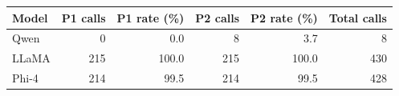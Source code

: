 \begin{tabular}{@{}lrrrrr@{}}
\toprule
Model & P1 calls & P1 rate (\%) & P2 calls & P2 rate (\%) & Total calls \\
\midrule
Qwen & 0 & 0.0 & 8 & 3.7 & 8 \\
LLaMA & 215 & 100.0 & 215 & 100.0 & 430 \\
Phi-4 & 214 & 99.5 & 214 & 99.5 & 428 \\
\bottomrule
\end{tabular}